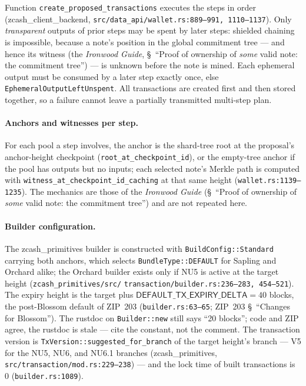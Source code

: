 \documentclass[11pt,a4paper]{article}
\theoremstyle{definition}
\begin{document}
Function \texttt{create\_proposed\_transactions} executes the steps in
order (\textsf{zcash\_client\_backend},
\texttt{src/data\_api/wallet.rs:889--991, 1110--1137}). Only
\emph{transparent} outputs of prior steps may be spent by later steps:
shielded chaining is impossible, because a note's position in the global
commitment tree --- and hence its
witness (the \emph{Ironwood Guide}, \S~``Proof of ownership of \emph{some}
valid note: the commitment tree'') --- is unknown before the note is mined.
Each ephemeral output must be consumed by a later step exactly once, else
\texttt{EphemeralOutputLeftUnspent}. All transactions are created first and
then stored together, so a failure cannot leave a partially transmitted
multi-step plan.

\paragraph{Anchors and witnesses per step.} For each pool a step involves,
the anchor is the shard-tree root at the proposal's anchor-height checkpoint
(\texttt{root\_at\_checkpoint\_id}), or the empty-tree anchor if the pool has
outputs but no inputs; each selected note's Merkle path is computed with
\texttt{witness\_at\_checkpoint\_id\_caching} at that same height
(\texttt{wallet.rs:1139--1235}). The mechanics are those of the
\emph{Ironwood Guide} (\S~``Proof of ownership of \emph{some} valid note: the
commitment tree'') and are not repeated here.

\paragraph{Builder configuration.} The \textsf{zcash\_primitives} builder is
constructed with \texttt{BuildConfig::}\allowbreak\texttt{Standard} carrying
both anchors, which selects \texttt{BundleType::DEFAULT} for Sapling and
Orchard alike; the Orchard builder exists only if NU5 is active at the
target height
(\texttt{zcash\_primitives/src/}\allowbreak%
\texttt{transaction/builder.rs:236--283, 454--521}).
The expiry height is the target plus
$\mathsf{DEFAULT\_TX\_EXPIRY\_DELTA} = 40$ blocks, the post-Blossom default
of ZIP~203 (\texttt{builder.rs:63--65}; ZIP~203 \S~``Changes for Blossom'').
The rustdoc on \texttt{Builder::new} still says ``20 blocks''; code and ZIP
agree, the rustdoc is stale --- cite the constant, not the comment. The
transaction version is \texttt{TxVersion::suggested\_for\_branch} of the
target height's branch --- V5 for the NU5, NU6, and NU6.1 branches
(\textsf{zcash\_primitives}, \texttt{src/transaction/mod.rs:229--238}) ---
and the
lock time of built transactions is $0$ (\texttt{builder.rs:1089}).
\end{document}
